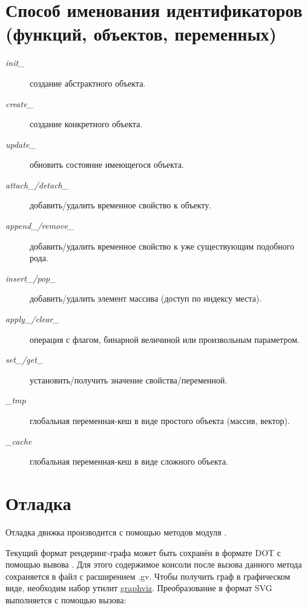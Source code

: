 \documentclass[a4paper,12pt,oneside]{sphinxmanual}
\begin{document}
\section{Способ именования идентификаторов (функций, объектов, переменных)}
\label{developers_advanced:id6}\begin{description}
\item[{\emph{init\_}}] \leavevmode
создание абстрактного объекта.

\item[{\emph{create\_}}] \leavevmode
создание конкретного объекта.

\item[{\emph{update\_}}] \leavevmode
обновить состояние имеющегося объекта.

\item[{\emph{attach\_/detach\_}}] \leavevmode
добавить/удалить временное свойство к объекту.

\item[{\emph{append\_/remove\_}}] \leavevmode
добавить/удалить временное свойство к уже существующим подобного рода.

\item[{\emph{insert\_/pop\_}}] \leavevmode
добавить/удалить элемент массива (доступ по индексу места).

\item[{\emph{apply\_/clear\_}}] \leavevmode
операция с флагом, бинарной величиной или произвольным параметром.

\item[{\emph{set\_/get\_}}] \leavevmode
установить/получить значение свойства/переменной.

\item[{\emph{\_tmp}}] \leavevmode
глобальная переменная-кеш в виде простого объекта (массив, вектор).

\item[{\emph{\_cache}}] \leavevmode
глобальная переменная-кеш в виде сложного объекта.

\end{description}


\section{Отладка}
\label{developers_advanced:debugging}\label{developers_advanced:id7}
Отладка движка производится с помощью методов модуля .

Текущий формат рендеринг-графа может быть сохранён в формате DOT с помощью
вывова . Для этого содержимое консоли после
вызова данного метода сохраняется в файл с расширением .gv. Чтобы получить граф
в графическом виде, необходим набор утилит \href{http://www.graphviz.org/}{graphviz}.
Преобразование в формат SVG выполняется с помощью вызова:
\end{document}
